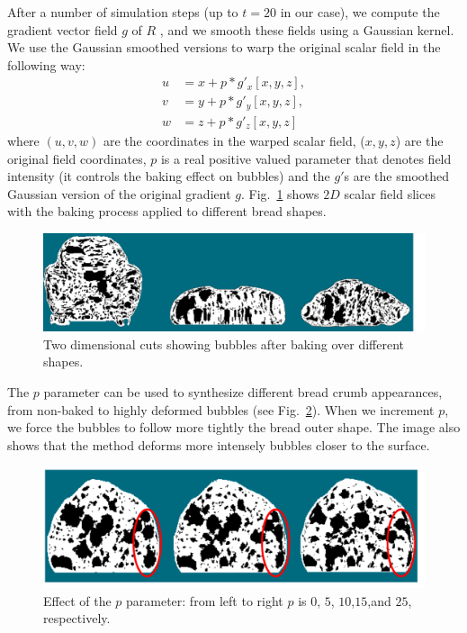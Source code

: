 \documentclass[spanish,a4paper,11pt,oneside,links]{report}
\begin{document}
After a number of simulation steps (up to $t=20$ in our case), we compute the gradient vector field $g$ of $R$ \cite{Gonzalez2006}, and we smooth these fields using a Gaussian kernel.
We use the Gaussian smoothed versions to warp the original scalar field in the following way:
\begin{align*}
\displaystyle
u &= x+p*g'_{x}[x,y,z],\\
v &= y+p*g'_{y}[x,y,z],\\
w &= z+p*g'_{z}[x,y,z]
\end{align*}
where $(u,v,w)$ are the coordinates in the warped scalar field, ($x,y,z$) are the original field coordinates, $p$ is a real positive valued parameter that denotes field intensity (it controls the baking effect on bubbles) and the $g'$s are the smoothed Gaussian version of the original gradient $g$.
Fig.~\ref{fg:bakedbubbles} shows $2D$ scalar field slices with the baking process applied to different bread shapes.

\begin{figure}
\includegraphics[width=15cm]{figures/bakedbubbles}
\caption{Two dimensional cuts showing bubbles after baking over different shapes.}
\label{fg:bakedbubbles}
\end{figure}

The $p$ parameter can be used to synthesize different bread crumb appearances, from non-baked to highly deformed bubbles (see Fig.~\ref{fg:parameterp}).
When we increment $p$, we force the bubbles to follow more tightly the bread outer shape. 
The image also shows that the method deforms more intensely bubbles closer to the surface.

\begin{figure}
\includegraphics[width=15cm]{figures/parameterp}
\caption{Effect of the $p$ parameter: from left to right $p$ is $0$, $5$, $10$,$15$,and $25$, respectively.}
\label{fg:parameterp}
\end{figure}
\end{document}
